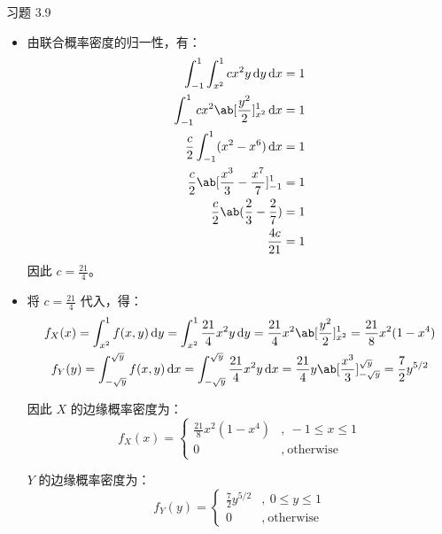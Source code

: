 \begin{problem}
    习题 3.9
    \begin{solution}
        \begin{itemize}
            \item[\textbf{1)}] 由联合概率密度的归一性，有：
            $$
            \begin{aligned}
                \int_{-1}^1 \int_{x^2}^1 cx^2y \dd{y} \dd{x} & = 1 \\
                \int_{-1}^1 cx^2 \ab[\frac{y^2}{2}]_{x^2}^1 \dd{x} & = 1 \\
                \frac{c}{2} \int_{-1}^1 (x^2 - x^6) \dd{x} & = 1 \\
                \frac{c}{2} \ab[\frac{x^3}{3} - \frac{x^7}{7}]_{-1}^1 & = 1 \\
                \frac{c}{2} \ab(\frac{2}{3} - \frac{2}{7}) & = 1 \\
                \frac{4c}{21} & = 1
            \end{aligned}
            $$
            因此 $c = \frac{21}{4}$。

            \item[\textbf{2)}] 将 $c = \frac{21}{4}$ 代入，得：
            $$
            \begin{gathered}
                f_X(x) = \int_{x^2}^1 f(x, y) \dd{y} = \int_{x^2}^1 \frac{21}{4}x^2y \dd{y} = \frac{21}{4}x^2 \ab[\frac{y^2}{2}]_{x^2}^1 = \frac{21}{8}x^2(1 - x^4) \\
                f_Y(y) = \int_{-\sqrt{y}}^{\sqrt{y}} f(x, y) \dd{x} = \int_{-\sqrt{y}}^{\sqrt{y}} \frac{21}{4}x^2y \dd{x} = \frac{21}{4}y \ab[\frac{x^3}{3}]_{-\sqrt{y}}^{\sqrt{y}} = \frac{7}{2}y^{5/2}
            \end{gathered}
            $$

            因此 $X$ 的边缘概率密度为：
            $$
            f_X(x) = \begin{cases}
                \frac{21}{8}x^2(1 - x^4) &,\ -1 \le x \le 1 \\
                0 &,\ \text{otherwise}
            \end{cases}
            $$

            $Y$ 的边缘概率密度为：
            $$
            f_Y(y) = \begin{cases}
                \frac{7}{2}y^{5/2} &,\ 0 \le y \le 1 \\
                0 &,\ \text{otherwise}
            \end{cases}
            $$
        \end{itemize}
    \end{solution}
\end{problem}